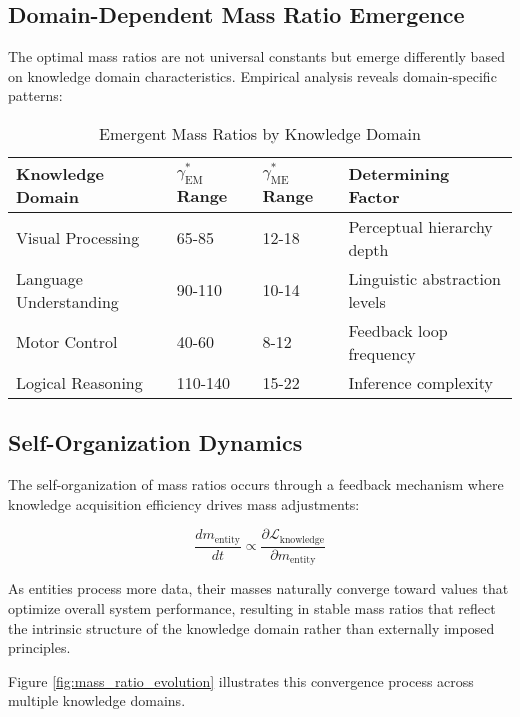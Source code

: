 \subsection{Domain-Dependent Mass Ratio Emergence}

The optimal mass ratios are not universal constants but emerge differently based on knowledge domain characteristics. Empirical analysis reveals domain-specific patterns:

\begin{table}[h]
\centering
\caption{Emergent Mass Ratios by Knowledge Domain}
\label{tab:emergent_mass_ratios}
\begin{tabular}{p{3cm} p{3cm} p{3cm} p{4cm}}
\textbf{Knowledge Domain} & \textbf{$\gamma_{\text{EM}}^*$ Range} & \textbf{$\gamma_{\text{ME}}^*$ Range} & \textbf{Determining Factor} \\
\hline
Visual Processing & 65-85 & 12-18 & Perceptual hierarchy depth \\
Language Understanding & 90-110 & 10-14 & Linguistic abstraction levels \\
Motor Control & 40-60 & 8-12 & Feedback loop frequency \\
Logical Reasoning & 110-140 & 15-22 & Inference complexity \\
\hline
\end{tabular}
\end{table}

\subsection{Self-Organization Dynamics}

The self-organization of mass ratios occurs through a feedback mechanism where knowledge acquisition efficiency drives mass adjustments:

\begin{equation}
\frac{dm_{\text{entity}}}{dt} \propto \frac{\partial \mathcal{L}_{\text{knowledge}}}{\partial m_{\text{entity}}}
\end{equation}

As entities process more data, their masses naturally converge toward values that optimize overall system performance, resulting in stable mass ratios that reflect the intrinsic structure of the knowledge domain rather than externally imposed principles.

Figure \ref{fig:mass_ratio_evolution} illustrates this convergence process across multiple knowledge domains.


